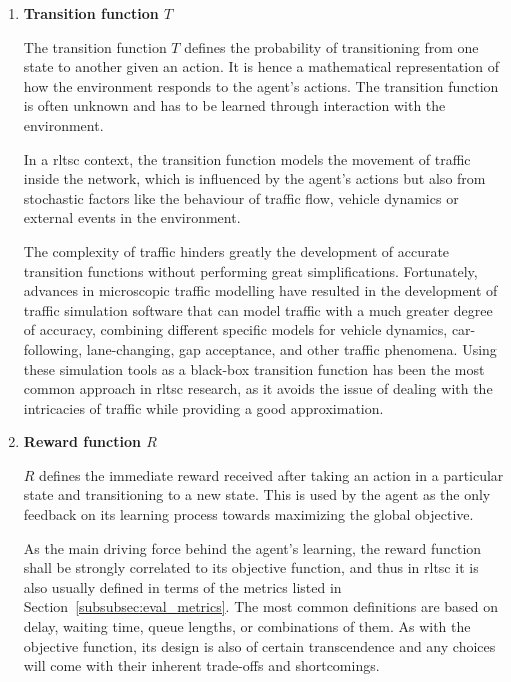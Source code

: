 \begin{enumerate}
    \item[] \textbf{Transition function $T$}
    
    \noindent The transition function $T$ defines the probability of transitioning from one state to another given an action. It is hence a mathematical representation of how the environment responds to the agent's actions. The transition function is often unknown and has to be learned through interaction with the environment.

    In a \gls{rltsc} context, the transition function models the movement of traffic inside the network, which is influenced by the agent's actions but also from stochastic factors like the behaviour of traffic flow, vehicle dynamics or external events in the environment.
    
    The complexity of traffic hinders greatly the development of accurate transition functions without performing great simplifications. Fortunately, advances in microscopic traffic modelling have resulted in the development of traffic simulation software that can model traffic with a much greater degree of accuracy, combining different specific models for vehicle dynamics, car-following, lane-changing, gap acceptance, and other traffic phenomena. Using these simulation tools as a black-box transition function has been the most common approach in \gls{rltsc} research, as it avoids the issue of dealing with the intricacies of traffic while providing a good approximation.

    \item[] \textbf{Reward function $R$}
    
    $R$ defines the immediate reward received after taking an action in a particular state and transitioning to a new state. This is used by the agent as the only feedback on its learning process towards maximizing the global objective.
    
    As the main driving force behind the agent's learning, the reward function shall be strongly correlated to its objective function, and thus in \gls{rltsc} it is also usually defined in terms of the metrics listed in Section~\ref{subsubsec:eval_metrics}. The most common definitions are based on delay, waiting time, queue lengths, or  combinations of them. As with the objective function, its design is also of certain transcendence and any choices will come with their inherent trade-offs and shortcomings.

\end{enumerate}

